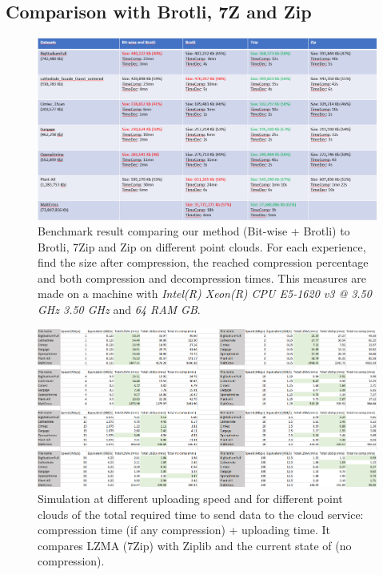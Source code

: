 \subsection{Comparison with Brotli, 7Z and Zip}
\label{subsc:compression-benchmark}
\begin{figure}
    \includegraphics[width=\textwidth]{img/bit-wise-benchmark.png}
    \caption{Benchmark result comparing our method (Bit-wise + Brotli) to Brotli, 7Zip and Zip on different point clouds. For each experience, find the size after compression, the reached compression percentage and both compression and decompression times. This measures are made on a machine with \emph{Intel(R) Xeon(R) CPU E5-1620 v3 @ 3.50 GHz 3.50 GHz} and \emph{64 RAM GB}.}
    \label{fig:bit-wise-benchmark}
\end{figure}

\begin{figure}
    \includegraphics[width=\textwidth]{img/compare1.png}
    \caption{Simulation at different uploading speed and for different point clouds of the total required time to send data to the cloud service: compression time (if any compression) + uploading time. It compares LZMA (7Zip) with Ziplib and the current state of \CC (no compression).}
    \label{fig:compare-excel}
\end{figure}

